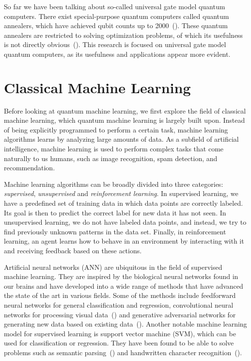 \documentclass[a4paper,10pt]{article}
\begin{document}
So far we have been talking about so-called universal gate model quantum computers.
There exist special-purpose quantum computers called quantum annealers, which have achieved qubit counts up to 2000~(\cite{dwave-2000}).
These quantum annealers are restricted to solving optimization problems, of which its usefulness is not directly obvious~(\cite{how-quantum-dwave, aaronson-dwave, detecting-quantum-speedup}).
This research is focused on universal gate model quantum computers, as its usefulness and applications appear more evident.

\section{Classical Machine Learning} \label{sec:classical-ml}
Before looking at quantum machine learning, we first explore the field of classical machine learning, which quantum machine learning is largely built upon.
Instead of being explicitly programmed to perform a certain task, machine learning algorithms learns by analyzing large amounts of data.
As a subfield of artificial intelligence, machine learning is used to perform complex tasks that come naturally to us humans, such as image recognition, spam detection, and recommendation.

Machine learning algorithms can be broadly divided into three categories: \emph{supervised}, \emph{unsupervised} and \emph{reinforcement learning}.
In supervised learning, we have a predefined set of training data in which data points are correctly labeled.
Its goal is then to predict the correct label for new data it has not seen.
In unsupervised learning, we do not have labeled data points, and instead, we try to find previously unknown patterns in the data set.
Finally, in reinforcement learning, an agent learns how to behave in an environment by interacting with it and receiving feedback based on these actions.

Artificial neural networks (ANN) are ubiquitous in the field of supervised machine learning.
They are inspired by the biological neural networks found in our brains and have developed into a wide range of methods that have advanced the state of the art in various fields.
Some of the methods include feedforward neural networks for general classification and regression, convolutional neural networks for processing visual data~(\cite{cirecsan2012multi}) and generative adversarial networks for generating new data based on existing data~(\cite{goodfellow2014generative}).
Another notable machine learning model for supervised learning is support vector machine (SVM), which can be used for classification or regression.
They have been found to be able to solve problems such as semantic parsing~(\cite{pradhan2004shallow}) and handwritten character recognition~(\cite{decoste2002training}).
\end{document}
